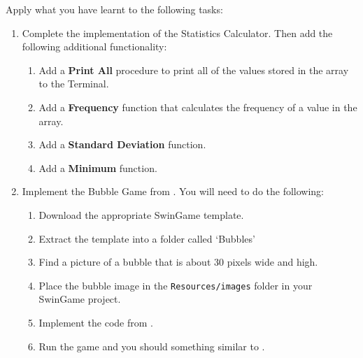 Apply what you have learnt to the following tasks:
\begin{enumerate}
  \item Complete the implementation of the Statistics Calculator. Then add the following additional functionality:
  \begin{enumerate}
      \item Add a \textbf{Print All} procedure to print all of the values stored in the array to the Terminal.
      \begin{figure}[h]
      \end{figure}

      \item Add a \textbf{Frequency} function that calculates the frequency of a value in the array.
\begin{figure}[h]
\end{figure}

      \item Add a \textbf{Standard Deviation} function.
      \begin{figure}[h]
      \end{figure}

      \item Add a \textbf{Minimum} function.
      \begin{figure}[h]
      \end{figure}
  \end{enumerate}
  \clearpage
  \item Implement the Bubble Game from  . You will need to do the following:
  \begin{enumerate}
    \item Download the appropriate SwinGame template.
    \item Extract the template into a folder called `Bubbles'
    \item Find a picture of a bubble that is about 30 pixels wide and high.
    \item Place the bubble image in the \texttt{Resources/images} folder in your SwinGame project.
    \item Implement the code from .
    \item Run the game and you should something similar to .
  \end{enumerate}
  

\end{enumerate}
